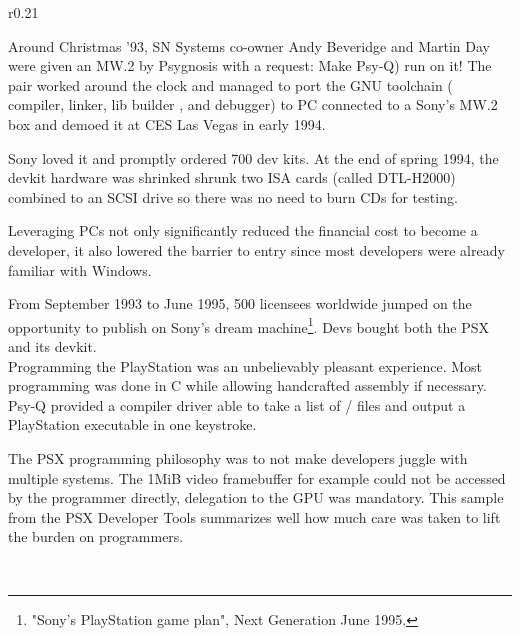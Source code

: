 \vspace{-10pt}
\begin{wrapfigure}[10]{r}{0.21\textwidth}{
\centering {}}
\end{wrapfigure}
Around Christmas '93, SN Systems co-owner Andy Beveridge and Martin Day were given an MW.2 by Psygnosis with a request: Make Psy-Q) run on it! The pair worked around the clock and managed to port the GNU toolchain ( compiler,  linker, lib builder , and  debugger) to PC connected to a Sony's MW.2 box and demoed it at CES Las Vegas in early 1994.\\
\par
 Sony loved it and promptly ordered 700 dev kits. At the end of spring 1994, the devkit hardware was shrinked shrunk two ISA cards (called DTL-H2000) combined to an SCSI drive so there was no need to burn CDs for testing.\\
\vspace{5pt}
\vspace{-10pt}
\par
Leveraging PCs not only significantly reduced the financial cost to become a developer, it also lowered the barrier to entry since most developers were already familiar with Windows.\\
\par
From September 1993 to June 1995, 500 licensees worldwide jumped on the opportunity to publish on Sony's dream machine\footnote{"Sony's PlayStation game plan", Next Generation June 1995.}. Devs bought both the PSX and its devkit.\\
Programming the PlayStation was an unbelievably pleasant experience. Most programming was done in C while allowing handcrafted assembly if necessary. Psy-Q provided a compiler driver able to take a list of / files and output a PlayStation executable in one keystroke.\\
\par
The PSX programming philosophy was to not make developers juggle with multiple systems. The 1MiB video framebuffer for example could not be accessed by the programmer directly, delegation to the GPU was mandatory. This sample from the PSX Developer Tools summarizes well how much care was taken to lift the burden on programmers.\\
\par
{}\\
\par
{}
\par









